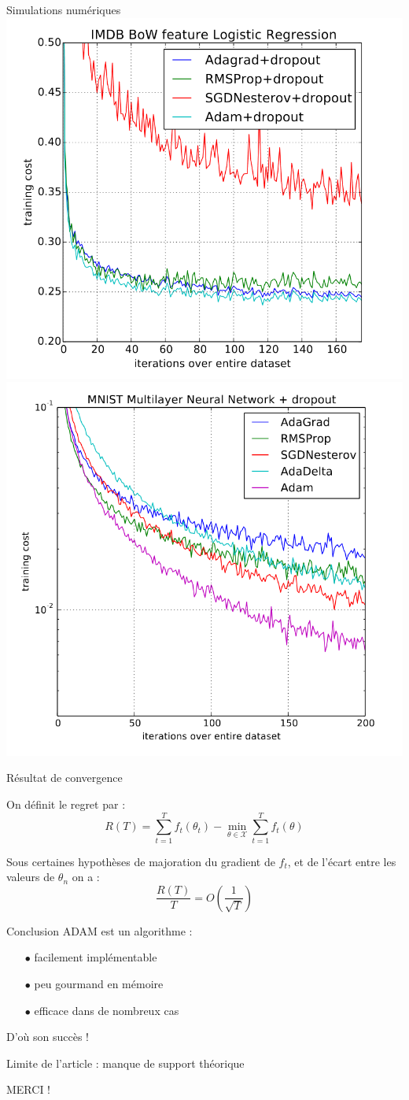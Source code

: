 \documentclass[11pt,aspectratio=169,xcolor=dvipsnames, french]{beamer}
\begin{document}
\begin{frame}{Simulations numériques}
 \includegraphics[width=0.45\linewidth]{../Images/IMDB_article.png}\hfill 
 \includegraphics[width=0.45\linewidth]{../Images/Multilayer.png} 
\end{frame}


\begin{frame}{Résultat de convergence}

On définit le regret par : $$R(T)=\sum_{t=1}^{T}f_t(\theta_t)-\min_{\theta\in\mathcal{X}}\sum_{t=1}^{T}f_t(\theta)$$

\begin{theorem}
  Sous certaines hypothèses de majoration du gradient de $f_t$, et de l'écart entre les valeurs de $\theta_n$ on a : 
    $$\frac{R(T)}{T}=O\left(\frac{1}{\sqrt{T}}\right)$$  
\end{theorem}

\end{frame}



\begin{frame}{Conclusion}
ADAM est un algorithme :  

\begin{itemize}
\item[$\bullet$] facilement implémentable 
\item[$\bullet$] peu gourmand en mémoire
\item[$\bullet$] efficace dans de nombreux cas
\end{itemize}

D'où son succès !

Limite de l'article : manque de support théorique

\end{frame}

\begin{frame}{}
\begin{center}
 \huge MERCI !
 \end{center}
\end{frame}
\end{document}
